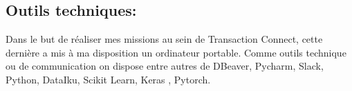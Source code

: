 \subsection{Outils techniques:}
Dans le but de réaliser mes missions au sein de Transaction Connect, cette dernière a mis à ma disposition un ordinateur portable. Comme outils technique ou de communication on dispose entre autres de DBeaver, Pycharm, Slack, 
 Python, DataIku, Scikit Learn, Keras , Pytorch.








